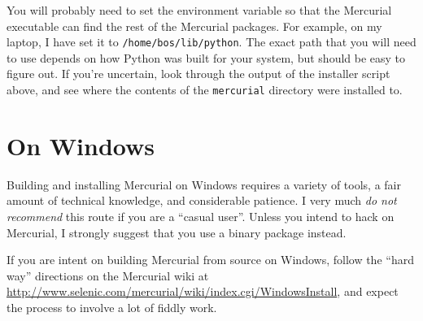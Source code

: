 You will probably need to set the  environment
variable so that the Mercurial executable can find the rest of the
Mercurial packages.  For example, on my laptop, I have set it to
\texttt{/home/bos/lib/python}.  The exact path that you will need to
use depends on how Python was built for your system, but should be
easy to figure out.  If you're uncertain, look through the output of
the installer script above, and see where the contents of the
\texttt{mercurial} directory were installed to.

\section{On Windows}

Building and installing Mercurial on Windows requires a variety of
tools, a fair amount of technical knowledge, and considerable
patience.  I very much \emph{do not recommend} this route if you are a
``casual user''.  Unless you intend to hack on Mercurial, I strongly
suggest that you use a binary package instead.

If you are intent on building Mercurial from source on Windows, follow
the ``hard way'' directions on the Mercurial wiki at
\url{http://www.selenic.com/mercurial/wiki/index.cgi/WindowsInstall},
and expect the process to involve a lot of fiddly work.

